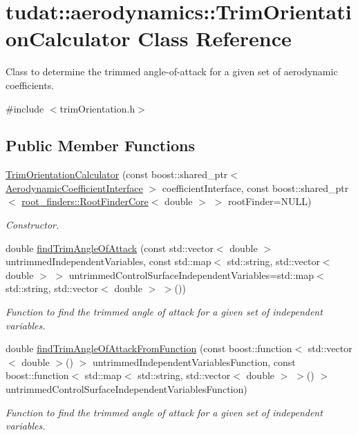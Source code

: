\hypertarget{classtudat_1_1aerodynamics_1_1TrimOrientationCalculator}{}\section{tudat\+:\+:aerodynamics\+:\+:Trim\+Orientation\+Calculator Class Reference}
\label{classtudat_1_1aerodynamics_1_1TrimOrientationCalculator}


Class to determine the trimmed angle-\/of-\/attack for a given set of aerodynamic coefficients.  




{\ttfamily \#include $<$trim\+Orientation.\+h$>$}

\subsection*{Public Member Functions}
\begin{DoxyCompactItemize}
\item 
\hyperlink{classtudat_1_1aerodynamics_1_1TrimOrientationCalculator_a499b019c78b10f2b530a60dfd655b165}{Trim\+Orientation\+Calculator} (const boost\+::shared\+\_\+ptr$<$ \hyperlink{classtudat_1_1aerodynamics_1_1AerodynamicCoefficientInterface}{Aerodynamic\+Coefficient\+Interface} $>$ coefficient\+Interface, const boost\+::shared\+\_\+ptr$<$ \hyperlink{classtudat_1_1root__finders_1_1RootFinderCore}{root\+\_\+finders\+::\+Root\+Finder\+Core}$<$ double $>$ $>$ root\+Finder=N\+U\+LL)
\begin{DoxyCompactList}\small\item\em Constructor. \end{DoxyCompactList}\item 
double \hyperlink{classtudat_1_1aerodynamics_1_1TrimOrientationCalculator_a3b09c56f60811b70789fadbe497c68eb}{find\+Trim\+Angle\+Of\+Attack} (const std\+::vector$<$ double $>$ untrimmed\+Independent\+Variables, const std\+::map$<$ std\+::string, std\+::vector$<$ double $>$ $>$ untrimmed\+Control\+Surface\+Independent\+Variables=std\+::map$<$ std\+::string, std\+::vector$<$ double $>$ $>$())
\begin{DoxyCompactList}\small\item\em Function to find the trimmed angle of attack for a given set of independent variables. \end{DoxyCompactList}\item 
double \hyperlink{classtudat_1_1aerodynamics_1_1TrimOrientationCalculator_a8c6633185f806975bf7ba85b05e493f8}{find\+Trim\+Angle\+Of\+Attack\+From\+Function} (const boost\+::function$<$ std\+::vector$<$ double $>$() $>$ untrimmed\+Independent\+Variables\+Function, const boost\+::function$<$ std\+::map$<$ std\+::string, std\+::vector$<$ double $>$ $>$() $>$ untrimmed\+Control\+Surface\+Independent\+Variables\+Function)
\begin{DoxyCompactList}\small\item\em Function to find the trimmed angle of attack for a given set of independent variables. \end{DoxyCompactList}\end{DoxyCompactItemize}


